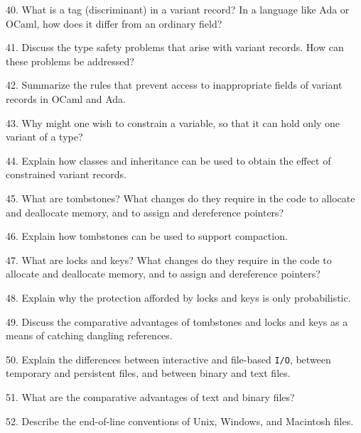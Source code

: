 40. What is a tag (discriminant) in a variant record? In a language like Ada or OCaml, how does it differ from an ordinary field?

\filbreak
\vskip 1cm

41. Discuss the type safety problems that arise with variant records. How can these problems be addressed?

\filbreak
\vskip 1cm

42. Summarize the rules that prevent access to inappropriate fields of variant records in OCaml and Ada.

\filbreak
\vskip 1cm

43. Why might one wish to constrain a variable, so that it can hold only one variant of a type?

\filbreak
\vskip 1cm

44. Explain how classes and inheritance can be used to obtain the effect of constrained variant records.

\filbreak
\vskip 1cm

45. What are tombstones? What changes do they require in the code to allocate and deallocate memory, and to assign and dereference pointers?

\filbreak
\vskip 1cm

46. Explain how tombstones can be used to support compaction.

\filbreak
\vskip 1cm

47. What are locks and keys? What changes do they require in the code to allocate and deallocate memory, and to assign and dereference pointers?

\filbreak
\vskip 1cm

48. Explain why the protection afforded by locks and keys is only probabilistic.

\filbreak
\vskip 1cm

49. Discuss the comparative advantages of tombstones and locks and keys as a means of catching dangling references.

\filbreak
\vskip 1cm

50. Explain the differences between interactive and file-based {\tt I/O}, between temporary and persistent files, and between binary and text files.

\filbreak
\vskip 1cm

51. What are the comparative advantages of text and binary files?

\filbreak
\vskip 1cm

52. Describe the end-of-line conventions of Unix, Windows, and Macintosh files.

